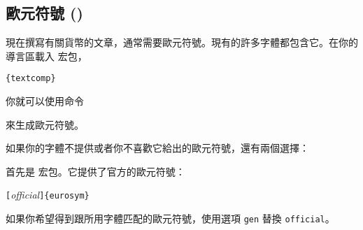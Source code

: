 \subsection{歐元符號 \texorpdfstring{(\officialeuro)}{}}

現在撰寫有關貨幣的文章，通常需要歐元符號。現有的許多字體都包含它。在你的導言區載入  宏包，
\begin{lscommand}
\verb|{textcomp}|
\end{lscommand}
你就可以使用命令
\begin{lscommand}
\end{lscommand}
來生成歐元符號。

如果你的字體不提供或者你不喜歡它給出的歐元符號，還有兩個選擇：

首先是  宏包。它提供了官方的歐元符號：
\begin{lscommand}
\verb|[|\emph{official}\verb|]{eurosym}|
\end{lscommand}
如果你希望得到跟所用字體匹配的歐元符號，使用選項 \texttt{gen} 替換 \texttt{official}。




